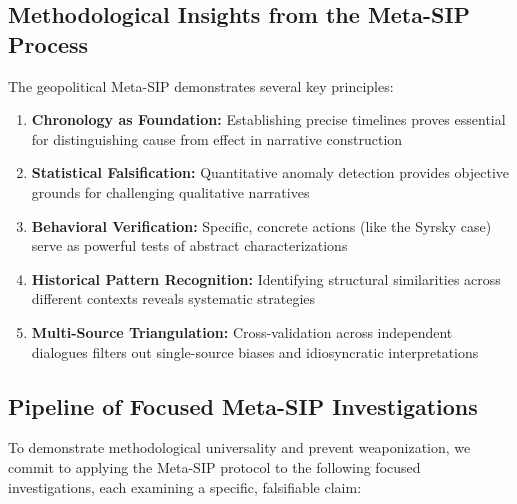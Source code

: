 \documentclass[11pt,a4paper]{article}
\begin{document}
\begin{small}
\subsection{Methodological Insights from the Meta-SIP Process}

The geopolitical Meta-SIP demonstrates several key principles:

\begin{enumerate}[leftmargin=*]
    \item \textbf{Chronology as Foundation:} Establishing precise timelines proves essential for distinguishing cause from effect in narrative construction
    \item \textbf{Statistical Falsification:} Quantitative anomaly detection provides objective grounds for challenging qualitative narratives
    \item \textbf{Behavioral Verification:} Specific, concrete actions (like the Syrsky case) serve as powerful tests of abstract characterizations
    \item \textbf{Historical Pattern Recognition:} Identifying structural similarities across different contexts reveals systematic strategies
    \item \textbf{Multi-Source Triangulation:} Cross-validation across independent dialogues filters out single-source biases and idiosyncratic interpretations
\end{enumerate}


\subsection{Pipeline of Focused Meta-SIP Investigations}

To demonstrate methodological universality and prevent weaponization, 
we commit to applying the Meta-SIP protocol to the following focused 
investigations, each examining a specific, falsifiable claim:


\end{small}
\end{document}
